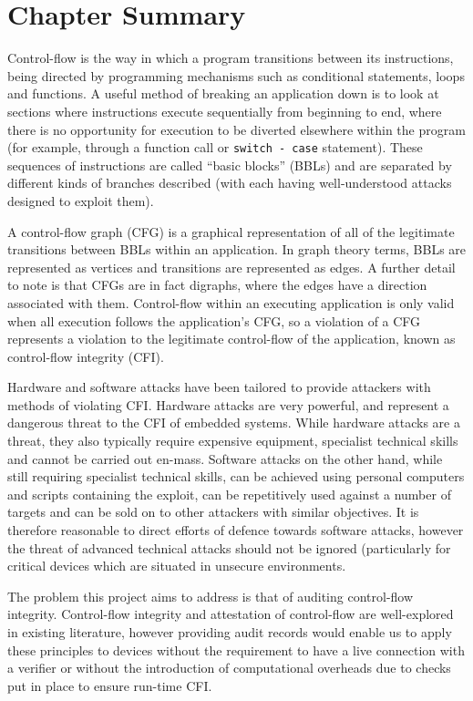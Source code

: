 \section{Chapter Summary}
Control-flow is the way in which a program transitions between its instructions, being directed by programming mechanisms such as conditional statements, loops and functions. A useful method of breaking an application down is to look at sections where instructions execute sequentially from beginning to end, where there is no opportunity for execution to be diverted elsewhere within the program (for example, through a function call or \verb|switch - case| statement). These sequences of instructions are called ``basic blocks'' (BBLs) and are separated by different kinds of branches described (with each having well-understood attacks designed to exploit them).

A control-flow graph (CFG) is a graphical representation of all of the legitimate transitions between BBLs within an application. In graph theory terms, BBLs are represented as vertices and transitions are represented as edges. A further detail to note is that CFGs are in fact digraphs, where the edges have a direction associated with them. Control-flow within an executing application is only valid when all execution follows the application's CFG, so a violation of a CFG represents a violation to the legitimate control-flow of the application, known as control-flow integrity (CFI).

Hardware and software attacks have been tailored to provide attackers with methods of violating CFI. Hardware attacks are very powerful, and represent a dangerous threat to the CFI of embedded systems. While hardware attacks are a threat, they also typically require expensive equipment, specialist technical skills and cannot be carried out en-mass. Software attacks on the other hand, while still requiring specialist technical skills, can be achieved using personal computers and scripts containing the exploit, can be repetitively used against a number of targets and can be sold on to other attackers with similar objectives. It is therefore reasonable to direct efforts of defence towards software attacks, however the threat of advanced technical attacks should not be ignored (particularly for critical devices which are situated in unsecure environments.

The problem this project aims to address is that of auditing control-flow integrity. Control-flow integrity and attestation of control-flow are well-explored in existing literature, however providing audit records would enable us to apply these principles to devices without the requirement to have a live connection with a verifier or without the introduction of computational overheads due to checks put in place to ensure run-time CFI.